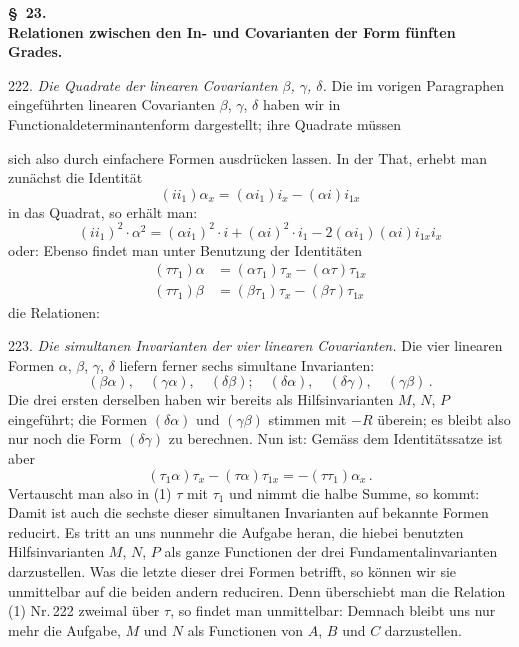 \begin{center}
\textbf{\S~23.}\\
\textbf{Relationen zwischen den In- und Covarianten der Form f\"unften Grades.}
\end{center}

222. \textit{Die Quadrate der linearen Covarianten $\beta$, $\gamma$, $\delta$.} Die im vorigen Paragraphen eingef\"uhrten linearen Covarianten $\beta$, $\gamma$, $\delta$ haben wir in Functionaldeterminantenform dargestellt; ihre Quadrate m\"ussen


sich also durch einfachere Formen ausdr\"ucken lassen. In der That, erhebt man zun\"achst die Identit\"at
\[
(ii_1)\alpha_x = (\alpha i_1)i_x - (\alpha i)i_{1x}
\]
in das Quadrat, so erh\"alt man:
\[
(ii_1)^2 \cdot \alpha^2 = (\alpha i_1)^2 \cdot i + (\alpha i)^2 \cdot i_1 - 2(\alpha i_1)(\alpha i)i_{1x}i_x
\]
oder:
Ebenso findet man unter Benutzung der Identit\"aten
\[
\begin{aligned}
(\tau\tau_1)\alpha &= (\alpha\tau_1)\tau_x - (\alpha\tau)\tau_{1x} \\
(\tau\tau_1)\beta &= (\beta\tau_1)\tau_x - (\beta\tau)\tau_{1x}
\end{aligned}
\]
die Relationen:

223. \textit{Die simultanen Invarianten der vier linearen Covarianten.} Die vier linearen Formen $\alpha$, $\beta$, $\gamma$, $\delta$ liefern ferner sechs simultane Invarianten:
\[
(\beta\alpha),\quad (\gamma\alpha),\quad (\delta\beta);\quad (\delta\alpha),\quad (\delta\gamma),\quad (\gamma\beta)\,.
\]
Die drei ersten derselben haben wir bereits als Hilfsinvarianten $M$, $N$, $P$ eingef\"uhrt; die Formen $(\delta\alpha)$ und $(\gamma\beta)$ stimmen mit $-R$ \"uberein; es bleibt also nur noch die Form $(\delta\gamma)$ zu berechnen. Nun ist:
Gem\"ass dem Identit\"atssatze ist aber
\[
(\tau_1\alpha)\tau_x - (\tau\alpha)\tau_{1x} = -(\tau\tau_1)\alpha_x\,.
\]
Vertauscht man also in (1) $\tau$ mit $\tau_1$ und nimmt die halbe Summe, so kommt:
Damit ist auch die sechste dieser simultanen Invarianten auf bekannte Formen reducirt. Es tritt an uns nunmehr die Aufgabe heran, die hiebei benutzten Hilfsinvarianten $M$, $N$, $P$ als ganze Functionen der drei Fundamentalinvarianten darzustellen. Was die letzte dieser drei Formen betrifft, so k\"onnen wir sie unmittelbar auf die beiden andern reduciren. Denn \"uberschiebt man die Relation (1) Nr.\,222 zweimal \"uber $\tau$, so findet man unmittelbar:
Demnach bleibt uns nur mehr die Aufgabe, $M$ und $N$ als Functionen von $A$, $B$ und $C$ darzustellen.


